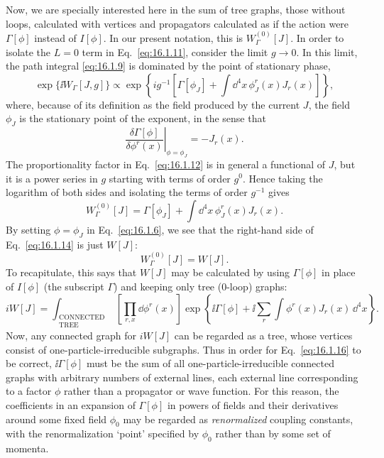 Now, we are specially interested here in the sum of tree graphs, those
without loops, calculated with vertices and propagators calculated as if
the action were $\Gamma[\phi]$ instead of $I[\phi]$. In our present notation, this is
$W_\Gamma^{(0)}[J]$. In order to isolate the $L=0$ term in Eq.\ \eqref{eq:16.1.11}, consider the
limit $g\to0$. In this limit, the path integral \eqref{eq:16.1.9} is dominated by the
point of stationary phase,
\begin{equation}
\exp\{\ii W_\Gamma[J,g]\}\propto
\exp\!\left\{ig^{-1}\left[\Gamma[\phi_J]+\int \dd^4x\,\phi_J^r(x)J_r(x)\right]\right\},
\label{eq:16.1.12}
\end{equation}
where, because of its definition as the field produced by the current $J$, the
field $\phi_J$ is the stationary point of the exponent, in the sense that
\begin{equation}
\left.\frac{\delta\Gamma[\phi]}{\delta\phi^r(x)}\right|_{\phi=\phi_J}=-J_r(x).
\label{eq:16.1.13}
\end{equation}
The proportionality factor in Eq.\ \eqref{eq:16.1.12} is in general a functional of $J$,
but it is a power series in $g$ starting with terms of order $g^0$. Hence taking
the logarithm of both sides and isolating the terms of order $g^{-1}$ gives
\begin{equation}
W_\Gamma^{(0)}[J]=\Gamma[\phi_J]+\int \dd^4x\,\phi_J^r(x)J_r(x).
\label{eq:16.1.14}
\end{equation}
By setting $\phi=\phi_J$ in Eq.\ \eqref{eq:16.1.6}, we see that the right-hand side of
Eq.\ \eqref{eq:16.1.14} is just $W[J]$:
\begin{equation}
W_\Gamma^{(0)}[J]=W[J].
\label{eq:16.1.15}
\end{equation}
To recapitulate, this says that $W[J]$ may be calculated by using $\Gamma[\phi]$ in
place of $I[\phi]$ (the subscript $\Gamma$) and keeping only tree (0-loop) graphs:
\begin{equation}
iW[J]=\int_{\substack{\mathrm{CONNECTED}\\\mathrm{TREE}}}
\left[\prod_{r,x}\dd\phi^r(x)\right]
\exp\!\left\{\ii\Gamma[\phi]+\ii\sum_r\int\phi^r(x)J_r(x)\,\dd^4x\right\}.
\label{eq:16.1.16}
\end{equation}
Now, any connected graph for $iW[J]$ can be regarded as a tree, whose
vertices consist of one-particle-irreducible subgraphs. Thus in order for
Eq.\ \eqref{eq:16.1.16} to be correct, $\ii\Gamma[\phi]$ must be the sum of all
one-particle-irreducible connected graphs with arbitrary numbers of external lines,
each external line corresponding to a factor $\phi$ rather than a propagator
or wave function. For this reason, the coefficients in an expansion of $\Gamma[\phi]$
in powers of fields and their derivatives around some fixed field $\phi_0$ may
be regarded as \emph{renormalized} coupling constants, with the renormalization
`point' specified by $\phi_0$ rather than by some set of momenta.

